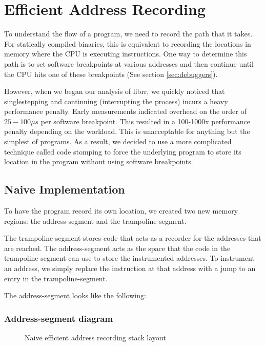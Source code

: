 \chapter{Efficient Address Recording}
\label{sec:effaddrrec}

To understand the flow of a program, we need to record the path that it takes. For statically compiled binaries, this is equivalent to recording the locations in memory where the CPU is executing instructions. One way to determine this path is to set software breakpoints at various addresses and then continue until the CPU hits one of these breakpoints (See section \ref{sec:debuggers}).

However, when we began our analysis of librr, we quickly noticed that singlestepping and continuing (interrupting the process) incurs a heavy performance penalty. Early measurements indicated overhead on the order of $25-100 \mu s$ per software breakpoint. This resulted in a 100-1000x performance penalty depending on the workload. This is unacceptable for anything but the simplest of programs. As a result, we decided to use a more complicated technique called code stomping to force the underlying program to store its location in the program without using software breakpoints.

\section{Naive Implementation}

To have the program record its own location, we created two new memory regions: the address-segment and the trampoline-segment.

The trampoline segment stores code that acts as a recorder for the addresses that are reached. The address-segment acts as the space that the code in the trampoline-segment can use to store the instrumented addresses. To instrument an address, we simply replace the instruction at that address with a jump to an entry in the trampoline-segment.

The address-segment looks like the following:
\subsection{Address-segment diagram}
\begin{figure}
\begin{drawstack}
  \startframe
   
  \startframe
   \cellcom{}
   
   \cellcom{}
   \cellcom{}
   \cellcom{}
   
\end{drawstack}
  \caption{Naive efficient address recording stack layout}
\end{figure}
